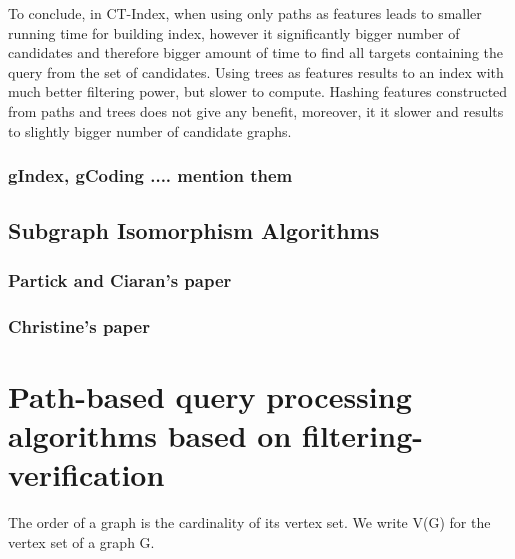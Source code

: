 \documentclass{l4proj}
\begin{document}
To conclude, in CT-Index, when using only paths as features leads to smaller running time for building index, however it significantly bigger number of candidates and therefore bigger amount of time to find all targets containing the query from the set of candidates. Using trees as features results to an index with much better filtering power, but slower to compute. Hashing features constructed from paths and trees does not give any benefit, moreover, it it slower and results to slightly bigger number of candidate graphs.\par

\subsection{gIndex, gCoding .... mention them}
\label{sec:otherindexes}
\section{Subgraph Isomorphism Algorithms}
\label{sec:sipalgos}
\subsection{Partick and Ciaran's paper}
\label{sec:sippatrick}
\subsection{Christine's paper}
\label{sec:sipchristine}

\chapter{Path-based query processing algorithms based on filtering-verification }

The order of a graph is the cardinality of its
vertex set. We write V(G) for the vertex set of a graph G.
\end{document}
